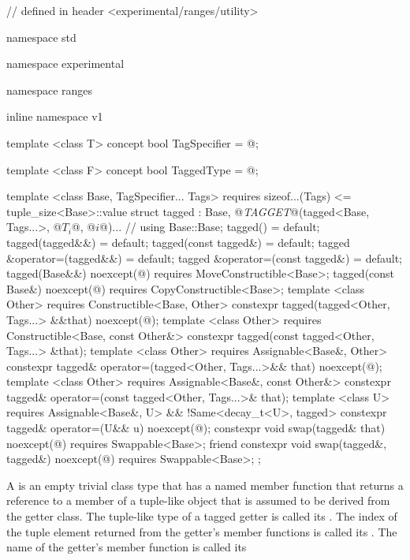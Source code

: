 %
\begin{codeblock}
// defined in header <experimental/ranges/utility>

namespace std { namespace experimental { namespace ranges { inline namespace v1 {
  template <class T>
  concept bool TagSpecifier = @\impdef@;

  template <class F>
  concept bool TaggedType = @\impdef@;

  template <class Base, TagSpecifier... Tags>
    requires sizeof...(Tags) <= tuple_size<Base>::value
  struct tagged :
    Base, @\textit{TAGGET}@(tagged<Base, Tags...>, @$T_i$@, @$i$@)... { // \seebelow
    using Base::Base;
    tagged() = default;
    tagged(tagged&&) = default;
    tagged(const tagged&) = default;
    tagged &operator=(tagged&&) = default;
    tagged &operator=(const tagged&) = default;
    tagged(Base&&) noexcept(@\seebelow@)
      requires MoveConstructible<Base>;
    tagged(const Base&) noexcept(@\seebelow@)
      requires CopyConstructible<Base>;
    template <class Other>
      requires Constructible<Base, Other>
    constexpr tagged(tagged<Other, Tags...> &&that) noexcept(@\seebelow@);
    template <class Other>
      requires Constructible<Base, const Other&>
    constexpr tagged(const tagged<Other, Tags...> &that);
    template <class Other>
      requires Assignable<Base&, Other>
    constexpr tagged& operator=(tagged<Other, Tags...>&& that) noexcept(@\seebelow@);
    template <class Other>
      requires Assignable<Base&, const Other&>
    constexpr tagged& operator=(const tagged<Other, Tags...>& that);
    template <class U>
      requires Assignable<Base&, U> && !Same<decay_t<U>, tagged>
    constexpr tagged& operator=(U&& u) noexcept(@\seebelow@);
    constexpr void swap(tagged& that) noexcept(@\seebelow@)
      requires Swappable<Base>;
    friend constexpr void swap(tagged&, tagged&) noexcept(@\seebelow@)
      requires Swappable<Base>;
  };
}}}}
\end{codeblock}

\pnum A  is an empty trivial class type that has a named member function that
returns a reference to a member of a tuple-like object that is assumed to be derived from the getter
class. The tuple-like type of a tagged getter is called its .
The index of the tuple element returned from the getter's member functions is called its
. The name of the getter's member function is called its

